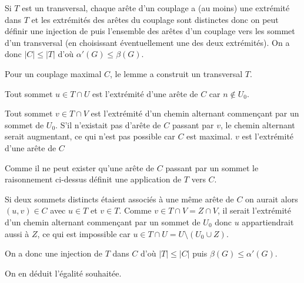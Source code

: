 \begin{Answer}
Si $T$ est un transversal, chaque arête d'un couplage a (au moins) une extrémité dans $T$ et les extrémités des arêtes du couplage sont distinctes donc on peut définir une injection de puis l'ensemble des arêtes d'un couplage vers les sommet d'un transversal (en choisissant éventuellement une des deux extrémités). On a donc $|C| \le |T|$ d'où $\alpha'(G) \le \beta(G)$.

\medskip

Pour un couplage maximal $C$, le lemme a construit un transversal $T$.

Tout sommet $u\in T\cap U$ est l'extrémité d'une arête de $C$ car $n\notin U_0$.

Tout sommet $v\in T\cap V$ est l'extrémité d'un chemin alternant commençant par un sommet de $U_0$. S'il n'existait pas d'arête de $C$ passant par $v$, le chemin alternant serait augmentant, ce qui n'est pas possible car $C$ est maximal. $v$ est l'extrémité d'une arête de $C$

Comme il ne peut exister qu'une arête de $C$ passant par un sommet le raisonnement ci-dessus définit une application de $T$ vers $C$.

Si deux sommets distincts étaient associés à une même arête de $C$ on aurait alors $(u, v) \in C$ avec $u\in T$ et $v\in T$. Comme $v\in T\cap V = Z\cap V$, il serait l'extrémité d'un chemin alternant commençant par un sommet de $U_0$ donc $u$ appartiendrait aussi à $Z$, ce qui est impossible car $u\in T\cap U = U\setminus(U_0\cup Z)$.

On a donc une injection de $T$ dans $C$ d'où $|T|\le |C|$ puis $\beta(G) \le \alpha'(G)$.

On en déduit l'égalité souhaitée.
\end{Answer}

